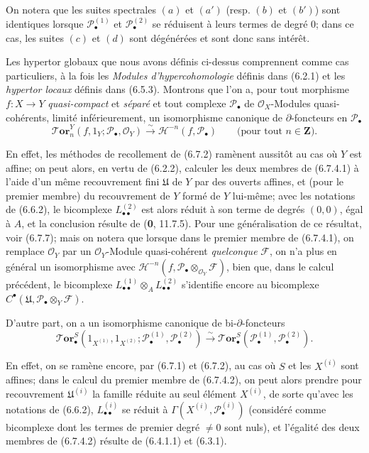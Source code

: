 On notera que les suites spectrales $(a)$ et $(a')$ (resp. $(b)$ et $(b')$)
sont identiques lorsque $\mathscr P_\bullet^{(1)}$ et
$\mathscr P_\bullet^{(2)}$ se réduisent à leurs termes de degré 0; dans ce cas,
les suites $(c)$ et $(d)$ sont dégénérées et sont donc sans intérêt.

\begin{remark}[6.7.4]
Les hypertor globaux que nous avons définis ci-dessus comprennent comme cas
particuliers, à la fois les \emph{Modules d'hypercohomologie} définis dans
(6.2.1) et les \emph{hypertor locaux} définis dans (6.5.3). Montrons que l'on
a, pour tout morphisme $f:X\to Y$ \emph{quasi-compact} et \emph{séparé} et tout
complexe $\mathscr P_\bullet$ de $\mathscr O_X$-Modules quasi-cohérents,
limité inférieurement, un isomorphisme canonique de $\partial$-foncteurs en
$\mathscr P_\bullet$
\[
  \boldsymbol{\mathscr{T}\!or}_n^Y(f,1_Y;\mathscr P_\bullet,\mathscr O_Y)
  \xrightarrow{\sim}
  \mathcal H^{-n}(f,\mathscr P_\bullet)
  \qquad\text{(pour tout $n\in\mathbf Z$)}.
  \tag{6.7.4.1}\label{III.6.7.4.1.fr}
\]

En effet, les méthodes de recollement de (6.7.2) ramènent aussitôt au cas où
$Y$ est affine; on peut alors, en vertu de (6.2.2), calculer les deux membres
de (6.7.4.1) à l'aide d'un même recouvrement fini $\mathfrak U$ de $Y$ par des
ouverts affines, et (pour le premier membre) du recouvrement de $Y$ formé de
$Y$ lui-même; avec les notations de (6.6.2), le bicomplexe
$L_{\bullet\bullet}^{(2)}$ est alors réduit à son terme de degrés $(0,0)$,
égal à $A$, et la conclusion résulte de (\textbf{0}, 11.7.5). Pour une
généralisation de ce résultat, voir (6.7.7); mais on notera que lorsque dans
le premier membre de (6.7.4.1), on remplace $\mathscr O_Y$ par un
$\mathscr O_Y$-Module quasi-cohérent \emph{quelconque} $\mathscr F$, on n'a
plus en général un isomorphisme avec
$\mathcal H^{-n}(f,\mathscr P_\bullet\otimes_{\mathscr O_Y}\mathscr F)$, bien
que, dans le calcul précédent, le bicomplexe
$L_{\bullet\bullet}^{(1)}\otimes_A L_{\bullet\bullet}^{(2)}$ s'identifie
encore au bicomplexe
$C^\bullet(\mathfrak U,\mathscr P_\bullet\otimes_Y\mathscr F)$.

D'autre part, on a un isomorphisme canonique de bi-$\partial$-foncteurs
\[
  \boldsymbol{\mathscr{T}\!or}_\bullet^S
  (1_{X^{(1)}},1_{X^{(2)}};
   \mathscr P_\bullet^{(1)},\mathscr P_\bullet^{(2)})
  \xrightarrow{\sim}
  \boldsymbol{\mathscr{T}\!or}_\bullet^S
  (\mathscr P_\bullet^{(1)},\mathscr P_\bullet^{(2)}).
  \tag{6.7.4.2}\label{III.6.7.4.2.fr}
\]

En effet, on se ramène encore, par (6.7.1) et (6.7.2), au cas où $S$ et les
$X^{(i)}$ sont affines; dans le calcul du premier membre de (6.7.4.2), on peut
alors prendre pour
recouvrement $\mathfrak U^{(i)}$ la famille réduite au seul élément $X^{(i)}$,
de sorte qu'avec les notations de (6.6.2), $L_{\bullet\bullet}^{(i)}$ se réduit
à $\Gamma(X^{(i)},\mathscr P_\bullet^{(i)})$ (considéré comme bicomplexe dont
les termes de premier degré $\ne0$ sont nuls), et l'égalité des deux membres
de (6.7.4.2) résulte de (6.4.1.1) et (6.3.1).
\end{remark}

